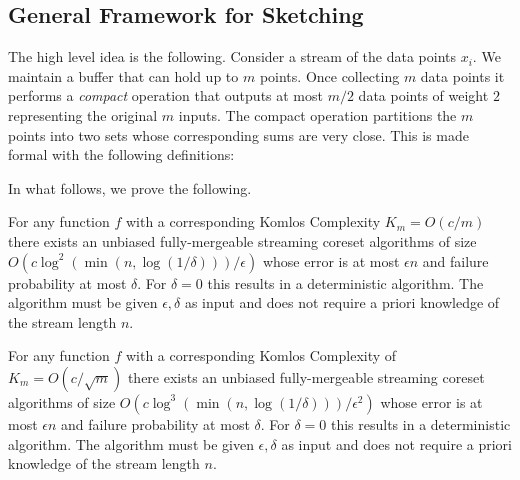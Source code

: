 \documentclass[anon,12pt]{colt2019} %
\newtheorem{fact}[theorem]{Fact}
\newcommand{\eps}{\epsilon}
\begin{document}
\subsection{General Framework for Sketching}


The high level idea is the following. 
Consider a stream of the data points $x_i$. 
We maintain a buffer that can hold up to $m$ points.
Once collecting $m$ data points it performs a \emph{compact} operation that outputs at most $m/2$ data points of weight $2$ representing the original $m$ inputs. The compact operation partitions the $m$ points into two sets whose corresponding sums are very close. 
This is made formal with the following definitions: 

In what follows, we prove the following.
\begin{theorem} \label{thm:streaming}
For any function $f$ with a corresponding Komlos Complexity $K_m = O(c/m)$ there exists an unbiased fully-mergeable streaming coreset algorithms of size 
$O\left(c\log^2\left(\min(n, \log(1/\delta)) \right)/\eps\right)$ whose error is at most $\eps n$ and failure probability at most $\delta$. For $\delta=0$ this results in a deterministic algorithm. The algorithm must be given $\eps, \delta$ as input and does not require a priori knowledge of the stream length $n$.
\end{theorem}


\begin{theorem}
For any function $f$ with a corresponding Komlos Complexity of $K_m = O(c/\sqrt{m})$ there exists an unbiased fully-mergeable streaming coreset algorithms of size 
$O\left(c\log^3\left(\min(n, \log(1/\delta)) \right)/\eps^2\right)$ whose error is at most $\eps n$ and failure probability at most $\delta$. For $\delta=0$ this results in a deterministic algorithm. The algorithm must be given $\eps, \delta$ as input and does not require a priori knowledge of the stream length $n$.
\end{theorem}
%
%
\end{document}
